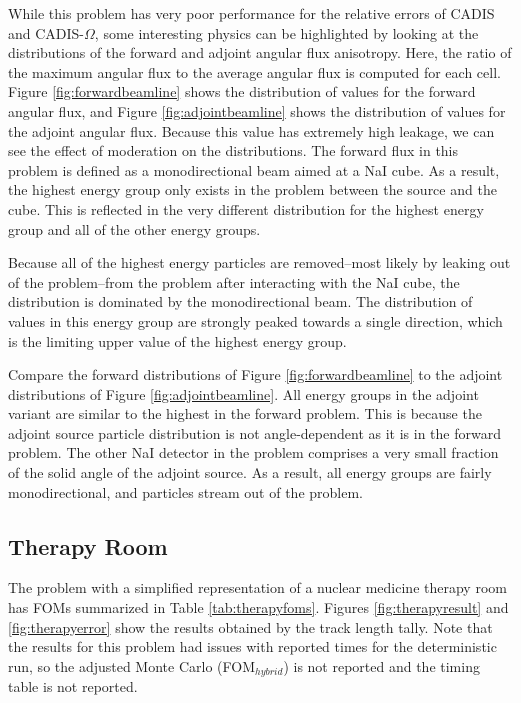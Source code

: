 While this problem has very poor performance for the relative errors of CADIS
and CADIS-$\Omega$, some interesting physics can be highlighted by looking at
the distributions of the forward and adjoint angular flux anisotropy. Here, the ratio of the
maximum angular flux to the average angular flux is computed for each cell.
Figure \ref{fig:forwardbeamline} shows the distribution of values for the
forward angular flux, and Figure \ref{fig:adjointbeamline} shows the distribution of
values for the adjoint angular flux. Because this value has extremely high leakage, we
can see the effect of moderation on the distributions. The forward flux in this
problem is defined as a monodirectional beam aimed at a NaI cube. As a result,
the highest energy group only exists in the problem between the source and the
cube. This is reflected in the very different distribution for the highest
energy group and all of the other energy groups.

Because all of the highest energy particles are removed--most likely by
leaking out of the problem--from the problem after interacting with the
NaI cube, the distribution is dominated by the monodirectional beam. The
distribution of values in this energy group are strongly peaked towards a single
direction, which is the limiting upper value of the highest energy group.

Compare the forward distributions of Figure \ref{fig:forwardbeamline} to the
adjoint distributions of Figure \ref{fig:adjointbeamline}. All energy groups
in the adjoint variant are similar to the highest in the forward problem. This
is because the adjoint source particle distribution is not angle-dependent as it
is in the forward problem. The other NaI detector in the problem comprises a very
small fraction of the solid angle of the adjoint source. As a result, all energy
groups are fairly monodirectional, and particles stream out of the problem.

\subsection{Therapy Room}
\label{subsec:resultstherapy}

The problem with a simplified representation of a nuclear medicine therapy room
has FOMs summarized in Table
\ref{tab:therapyfoms}. Figures
\ref{fig:therapyresult} and \ref{fig:therapyerror} show the results obtained
by the track length tally. Note that the results for this problem had issues with reported
times for the deterministic run, so the adjusted Monte Carlo
(FOM$_{hybrid}$) is not reported and the timing table is not reported.


